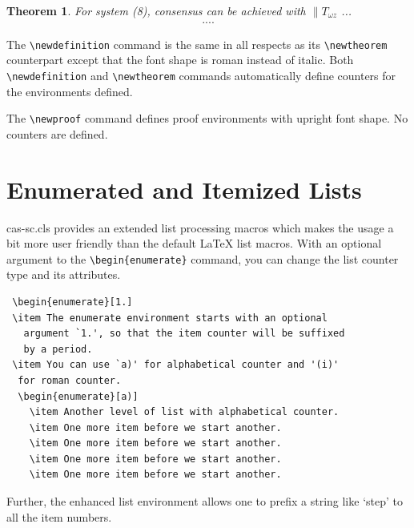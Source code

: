 \documentclass[a4paper,fleqn]{cas-sc}
\begin{document}
\newtheorem{theorem}{Theorem}

\begin{theorem}
For system (8), consensus can be achieved with 
$\|T_{\omega z}$ ...
\begin{eqnarray}\label{10}
....
\end{eqnarray}
\end{theorem}

The \verb+\newdefinition+ command is the same in
all respects as its \verb+\newtheorem+ counterpart except that
the font shape is roman instead of italic.  Both
\verb+\newdefinition+ and \verb+\newtheorem+ commands
automatically define counters for the environments defined.

The \verb+\newproof+ command defines proof environments with
upright font shape.  No counters are defined. 


\section[Enumerated ...]{Enumerated and Itemized Lists}
{cas-sc.cls} provides an extended list processing macros
which makes the usage a bit more user friendly than the default
\LaTeX{} list macros.   With an optional argument to the
\verb+\begin{enumerate}+ command, you can change the list counter
type and its attributes.

\begin{verbatim}
 \begin{enumerate}[1.]
 \item The enumerate environment starts with an optional
   argument `1.', so that the item counter will be suffixed
   by a period.
 \item You can use `a)' for alphabetical counter and '(i)' 
  for roman counter.
  \begin{enumerate}[a)]
    \item Another level of list with alphabetical counter.
    \item One more item before we start another.
    \item One more item before we start another.
    \item One more item before we start another.
    \item One more item before we start another.
\end{verbatim}

Further, the enhanced list environment allows one to prefix a
string like `step' to all the item numbers.  
\end{document}
